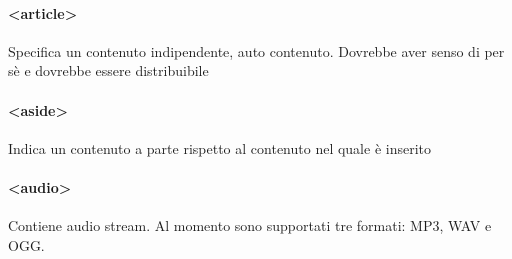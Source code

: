 \documentclass[11pt,a4paper]{book}
\begin{document}
\paragraph{<article>}
Specifica un contenuto indipendente, auto contenuto. Dovrebbe aver senso di per sè e dovrebbe essere distribuibile 

\paragraph{<aside>}
Indica un contenuto a parte rispetto al contenuto nel quale è inserito

\paragraph{<audio>}
Contiene audio stream. Al momento sono supportati tre formati: MP3, WAV e OGG.
\end{document}

